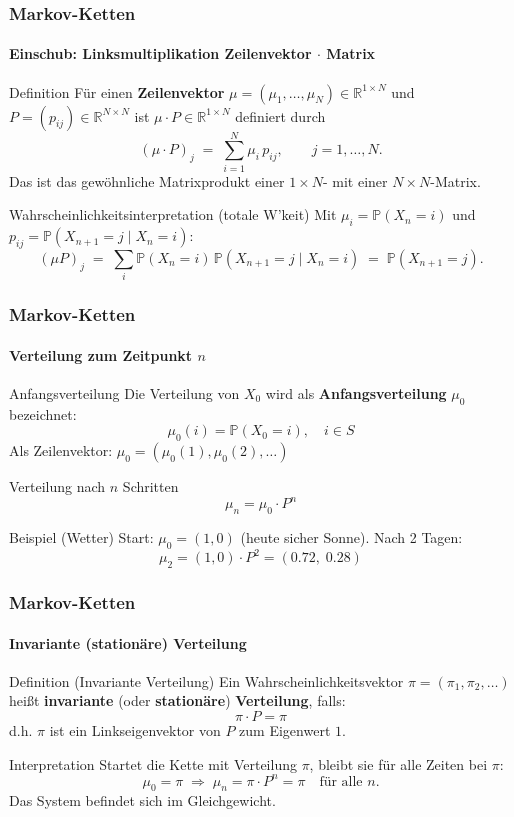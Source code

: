\documentclass{beamer}
\newcommand{\R}{\mathbb{R}}
\newcommand{\PP}{\mathbb{P}}
\begin{document}

\begin{frame}
    \frametitle{Markov-Ketten}
\framesubtitle{Einschub: Linksmultiplikation Zeilenvektor $\cdot$ Matrix}
\begin{block}{Definition}
Für einen \textbf{Zeilenvektor} $\mu = (\mu_1, \ldots, \mu_N) \in \R^{1 \times N}$ und $P = (p_{ij}) \in \R^{N \times N}$ ist $\mu \cdot P \in \R^{1 \times N}$ definiert durch
\[
(\mu \cdot P)_j \;=\; \sum_{i=1}^{N} \mu_i \, p_{ij}, \qquad j = 1, \ldots, N.
\]
Das ist das gewöhnliche Matrixprodukt einer $1 \!\times\! N$- mit einer $N \!\times\! N$-Matrix.
\end{block}
\begin{block}{Wahrscheinlichkeitsinterpretation (totale W'keit)}
Mit $\mu_i = \PP(X_n = i)$ und $p_{ij} = \PP(X_{n+1} = j \mid X_n = i)$:
\[
(\mu P)_j \;=\; \sum_i \PP(X_n = i)\, \PP(X_{n+1} = j \mid X_n = i) \;=\; \PP(X_{n+1} = j).
\]
\end{block}
 \end{frame}


\begin{frame}
    \frametitle{Markov-Ketten}
\framesubtitle{Verteilung zum Zeitpunkt $n$}
    \begin{block}{Anfangsverteilung}
Die Verteilung von $X_0$ wird als \textbf{Anfangsverteilung} $\mu_0$ bezeichnet:
\[
\mu_0(i) = \PP(X_0 = i), \quad i \in S
\]
Als Zeilenvektor: $\mu_0 = (\mu_0(1), \mu_0(2), \ldots)$
\end{block}
\begin{block}{Verteilung nach $n$ Schritten}
\[
\mu_n = \mu_0 \cdot P^n
\]
\end{block}
\begin{block}{Beispiel (Wetter)}
Start: $\mu_0 = (1, 0)$ (heute sicher Sonne). Nach 2 Tagen:
\[
\mu_2 = (1, 0) \cdot P^2 = (0.72, \; 0.28)
\]
\end{block}
 \end{frame}



\begin{frame}
    \frametitle{Markov-Ketten}
\framesubtitle{Invariante (stationäre) Verteilung}
    \begin{block}{Definition (Invariante Verteilung)}
Ein Wahrscheinlichkeitsvektor $\pi = (\pi_1, \pi_2, \ldots)$ heißt \textbf{invariante} (oder \textbf{stationäre}) \textbf{Verteilung}, falls:
\[
\pi \cdot P = \pi
\]
d.h. $\pi$ ist ein Linkseigenvektor von $P$ zum Eigenwert $1$.
\end{block}
\begin{block}{Interpretation}
Startet die Kette mit Verteilung $\pi$, bleibt sie für alle Zeiten bei $\pi$:
\[
\mu_0 = \pi \;\Rightarrow\; \mu_n = \pi \cdot P^n = \pi \quad \text{für alle } n.
\]
Das System befindet sich im Gleichgewicht.
\end{block}
 \end{frame}
\end{document}
